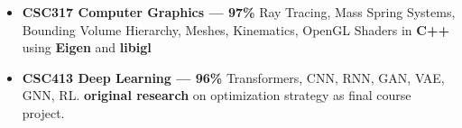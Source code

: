 \documentclass[10pt,a4paper,ragged2e,withhyper]{altacv}
\begin{document}
\begin{paracol}{2}
\begin{itemize}
    
 
    
    
\end{itemize}

\vspace{-3pt}

\vspace{-5pt}
\begin{itemize}
    
    \item  \textbf{CSC317 Computer Graphics --- 97\%}
    Ray Tracing, Mass Spring Systems, Bounding Volume Hierarchy, Meshes, Kinematics, OpenGL Shaders in \textbf{C++} using
        \textbf{Eigen} and \textbf{libigl} 

    \item  \textbf{CSC413 Deep Learning --- 96\%} Transformers, CNN,
        RNN, GAN, VAE, GNN, RL. \textbf{original research} on optimization
        strategy as final course project.\ 
    

\end{itemize}


\end{paracol}
\end{document}
